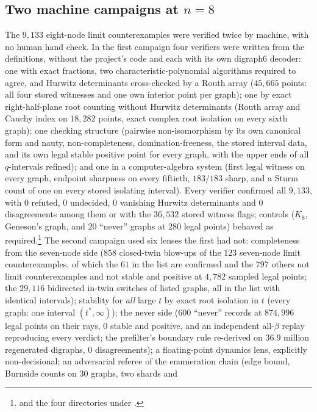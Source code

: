 \documentclass[11pt]{article}
\theoremstyle{definition}
\begin{document}
{\subsection{Two machine campaigns at \texorpdfstring{$n=8$}{n = 8}}
The $9{,}133$ eight-node limit counterexamples were verified twice by machine, with no human hand check. In the first
campaign four verifiers were written from the definitions, without the project's code and each with its own digraph6
decoder: one with exact fractions, two characteristic-polynomial algorithms required to agree, and Hurwitz determinants
cross-checked by a Routh array ($45{,}665$ points: all four stored witnesses and one own interior point per graph); one by
exact right-half-plane root counting without Hurwitz determinants (Routh array and Cauchy index on $18{,}282$ points,
exact complex root isolation on every sixth graph); one checking structure (pairwise non-isomorphism by its own canonical
form and nauty, non-completeness, domination-freeness, the stored interval data, and its own legal stable positive point for
every graph, with the upper ends of all $q$-intervals refined); and one in a computer-algebra system (first legal witness on
every graph, endpoint sharpness on every fiftieth, $183/183$ sharp, and a Sturm count of one on every stored isolating
interval). Every verifier confirmed all $9{,}133$, with $0$ refuted, $0$ undecided, $0$ vanishing Hurwitz determinants and
$0$ disagreements among them or with the $36{,}532$ stored witness flags; controls ($K_8$, Geneson's graph, and $20$ ``never''
graphs at $280$ legal points) behaved as required.\footnote{ and the four directories
under .} The second campaign used six lenses the first had not: completeness from the seven-node side
($858$ closed-twin blow-ups of the $123$ seven-node limit counterexamples, of which the $61$ in the list are confirmed and
the $797$ others not limit counterexamples and not stable and positive at $4{,}782$ sampled legal points; the $29{,}116$ bidirected in-twin switches of
listed graphs, all in the list with identical intervals); stability for \emph{all} large $t$ by exact root isolation in $t$
(every graph: one interval $(t^*,\infty)$); the never side ($600$ ``never'' records at $874{,}996$ legal points on their rays,
$0$ stable and positive, and an independent all-$\beta$ replay reproducing every verdict; the prefilter's boundary rule
re-derived on $36.9$ million regenerated digraphs, $0$ disagreements); a floating-point dynamics lens, explicitly
non-decisional; an adversarial referee of the enumeration chain (edge bound, Burnside counts on $30$ graphs, two shards and
}
\end{document}
